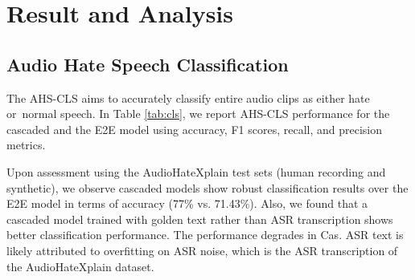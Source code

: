 \documentclass[11pt]{article}
\begin{document}
\begin{table}[t]
\centering
{}
\caption{Result of Audio Hate Speech Classification (AHS-CLS) on AudioHateXplain test sets.}
\label{tab:cls}
\end{table}





\section{Result and Analysis}
\subsection{Audio Hate Speech Classification}

The AHS-CLS aims to accurately classify entire audio clips as either hate or normal speech. In Table \ref{tab:cls}, we report AHS-CLS performance for the cascaded and the E2E model using accuracy, F1 scores, recall, and precision metrics.

Upon assessment using the AudioHateXplain test sets (human recording and synthetic), we observe cascaded models show robust classification results over the E2E model in terms of accuracy (77\% vs. 71.43\%).
Also, we found that a cascaded model trained with golden text rather than ASR transcription shows better classification performance. The performance degrades in Cas. ASR text is likely attributed to overfitting on ASR noise, which is the ASR transcription of the AudioHateXplain dataset.
\end{document}
